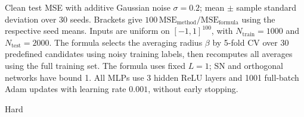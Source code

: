 \begin{table}[t]
\centering
\footnotesize
\setlength{\tabcolsep}{3pt}
\caption{Clean test MSE with additive Gaussian noise $\sigma=0.2$; mean $\pm$ sample standard deviation over 30 seeds. Brackets give $100\,\mathrm{MSE}_{\mathrm{method}}/\mathrm{MSE}_{\mathrm{formula}}$ using the respective seed means. Inputs are uniform on $[-1,1]^{100}$, with $N_{\mathrm{train}}=1000$ and $N_{\mathrm{test}}=2000$. The formula selects the averaging radius $\beta$ by 5-fold CV over 30 predefined candidates using noisy training labels, then recomputes all averages using the full training set. The formula uses fixed $L=1$; SN and orthogonal networks have bound 1. All MLPs use 3 hidden ReLU layers and 1001 full-batch Adam updates with learning rate $0.001$, without early stopping.}
\label{tab:noisy-0p2-ratio1}
\begin{subtable}{\textwidth}
\centering
\caption{Hard}
\label{tab:noisy-0p2-ratio1-1}
\end{subtable}
\par\medskip
\begin{subtable}{\textwidth}
\centering
\caption{Tied}
\label{tab:noisy-0p2-ratio1-2}
\end{subtable}
\end{table}

